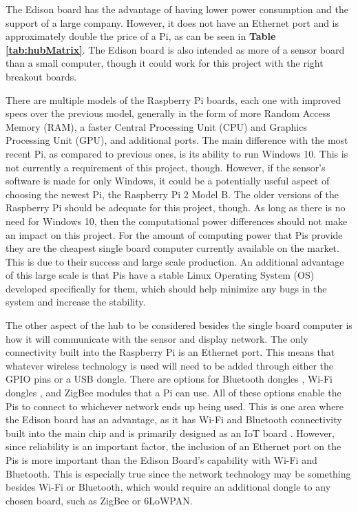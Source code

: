 \documentclass[PPFS.tex]{template/subfiles}
\begin{document}
The Edison board has the advantage of having lower power consumption and the support of a large company. However, it does not have an Ethernet port and is approximately double the price of a Pi, as can be seen in \textbf{Table \ref{tab:hubMatrix}}. The Edison board is also intended as more of a sensor board than a small computer, though it could work for this project with the right breakout boards. \cite{Intel}

There are multiple models of the Raspberry Pi boards, each one with improved specs over the previous model, generally in the form of more Random Access Memory (RAM), a faster Central Processing Unit (CPU) and Graphics Processing Unit (GPU), and additional ports. The main difference with the most recent Pi, as compared to previous ones, is its ability to run Windows 10. This is not currently a requirement of this project, though. However, if the sensor's software is made for only Windows, it could be a potentially useful aspect of choosing the newest Pi, the Raspberry Pi 2 Model B. The older versions of the Raspberry Pi should be adequate for this project, though. As long as there is no need for Windows 10, then the computational power differences should not make an impact on this project. For the amount of computing power that Pis provide they are the cheapest single board computer currently available on the market. This is due to their success and large scale production. An additional advantage of this large scale is that Pis have a stable Linux Operating System (OS) developed specifically for them, which should help minimize any bugs in the system and increase the stability. \cite{RaspberryPi}

The other aspect of the hub to be considered besides the single board computer is how it will communicate with the sensor and display network. The only connectivity built into the Raspberry Pi is an Ethernet port. This means that whatever wireless technology is used will need to be added through either the GPIO pins or a USB dongle. There are options for Bluetooth dongles \cite{AdaFruit}, Wi-Fi dongles \cite{RaspberryPi}, and ZigBee modules \cite{Zigbee} that a Pi can use. All of these options enable the Pis to connect to whichever network ends up being used. This is one area where the Edison board has an advantage, as it has Wi-Fi and Bluetooth connectivity built into the main chip and is primarily designed as an IoT board \cite{Intel}. However, since reliability is an important factor, the inclusion of an Ethernet port on the Pis is more important than the Edison Board's capability with Wi-Fi and Bluetooth. This is especially true since the network technology may be something besides Wi-Fi or Bluetooth, which would require an additional dongle to any chosen board, such as ZigBee or 6LoWPAN.
\end{document}
